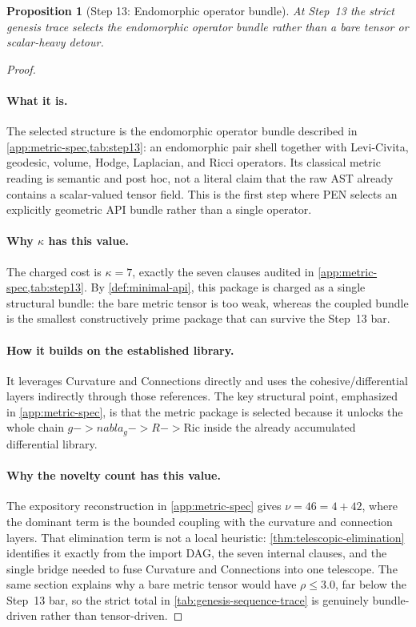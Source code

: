 \documentclass[11pt,a4paper]{article}
\def\to{->}%
\def\nabla{nabla}%
\theoremstyle{plain}
\newtheorem{proposition}[theorem]{Proposition}
\theoremstyle{definition}
\theoremstyle{remark}
\begin{document}
\begin{proposition}[Step 13: Endomorphic operator bundle]
\label{prop:genesis-step13}
At Step~13 the strict genesis trace selects the endomorphic operator bundle rather than a
bare tensor or scalar-heavy detour.
\end{proposition}

\begin{proof}
\paragraph{What it is.}
The selected structure is the endomorphic operator bundle described in
\cref{app:metric-spec,tab:step13}: an endomorphic pair shell together with
Levi-Civita, geodesic, volume, Hodge, Laplacian, and Ricci operators.
Its classical metric reading is semantic and post hoc, not a literal claim
that the raw AST already contains a scalar-valued tensor field.
This is the first step where PEN selects an explicitly geometric API bundle
rather than a single operator.

\paragraph{Why $\kappa$ has this value.}
The charged cost is $\kappa=7$, exactly the seven clauses audited in
\cref{app:metric-spec,tab:step13}.
By \cref{def:minimal-api}, this package is charged as a single structural bundle:
the bare metric tensor is too weak, whereas the coupled bundle is the smallest
constructively prime package that can survive the Step~13 bar.

\paragraph{How it builds on the established library.}
It leverages Curvature and Connections directly and uses the cohesive/differential
layers indirectly through those references.
The key structural point, emphasized in \cref{app:metric-spec}, is that the
metric package is selected because it unlocks the whole chain
$g\to\nabla_g\to R\to\mathrm{Ric}$ inside the already accumulated differential
library.

\paragraph{Why the novelty count has this value.}
The expository reconstruction in \cref{app:metric-spec} gives
$\nu=46=4+42$, where the dominant term is the bounded coupling with the
curvature and connection layers.
That elimination term is not a local heuristic: \cref{thm:telescopic-elimination}
identifies it exactly from the import DAG, the seven internal clauses, and the
single bridge needed to fuse Curvature and Connections into one telescope.
The same section explains why a bare metric tensor would have
$\rho\le 3.0$, far below the Step~13 bar, so the strict total in
\cref{tab:genesis-sequence-trace} is genuinely bundle-driven rather than
tensor-driven.


\end{proof}
\end{document}
